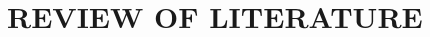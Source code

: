 \documentclass[12pt, oneside]{report} %
\begin{document}


\setcounter{page}{2}

\cleardoublepage 


\begin{spacing}{1.5}
\tableofcontents
\cleardoublepage
\end{spacing}

\cleardoublepage

\pagestyle{myplain}


\chapter{REVIEW OF LITERATURE}





\cleardoublepage
\begin{singlespace}
\renewcommand{\bibname}{LITERATURE CITED}

\end{singlespace}
\end{document}

